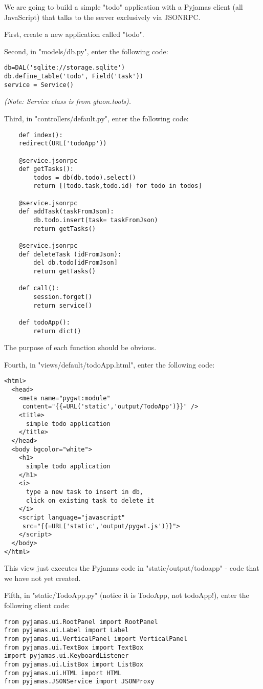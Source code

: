 \documentclass[justified,sixbynine,notoc]{tufte-book}
\begin{document}
\begin{fullwidth}
We are going to build a simple "todo" application with a Pyjamas client (all JavaScript) that talks to the server exclusively via JSONRPC.

First, create a new application called "todo".

Second, in "models/db.py", enter the following code:
\begin{lstlisting}
db=DAL('sqlite://storage.sqlite')
db.define_table('todo', Field('task'))
service = Service()
\end{lstlisting}

{\it (Note: Service class is from gluon.tools).}

Third, in "controllers/default.py", enter the following code:
\begin{lstlisting}
    def index():
    redirect(URL('todoApp'))

    @service.jsonrpc
    def getTasks():
        todos = db(db.todo).select()
        return [(todo.task,todo.id) for todo in todos]

    @service.jsonrpc
    def addTask(taskFromJson):
        db.todo.insert(task= taskFromJson)
        return getTasks()

    @service.jsonrpc
    def deleteTask (idFromJson):
        del db.todo[idFromJson]
        return getTasks()

    def call():
        session.forget()
        return service()

    def todoApp():
        return dict()
\end{lstlisting}

The purpose of each function should be obvious.

Fourth, in "views/default/todoApp.html", enter the following code:
\begin{lstlisting}[keywords={}]
<html>
  <head>
    <meta name="pygwt:module"
     content="{{=URL('static','output/TodoApp')}}" />
    <title>
      simple todo application
    </title>
  </head>
  <body bgcolor="white">
    <h1>
      simple todo application
    </h1>
    <i>
      type a new task to insert in db,
      click on existing task to delete it
    </i>
    <script language="javascript"
     src="{{=URL('static','output/pygwt.js')}}">
    </script>
  </body>
</html>
\end{lstlisting}

This view just executes the Pyjamas code in "static/output/todoapp" - code that we have not yet created.

Fifth, in "static/TodoApp.py" (notice it is TodoApp, not todoApp!),
enter the following client code:
\begin{lstlisting}
from pyjamas.ui.RootPanel import RootPanel
from pyjamas.ui.Label import Label
from pyjamas.ui.VerticalPanel import VerticalPanel
from pyjamas.ui.TextBox import TextBox
import pyjamas.ui.KeyboardListener
from pyjamas.ui.ListBox import ListBox
from pyjamas.ui.HTML import HTML
from pyjamas.JSONService import JSONProxy


\end{lstlisting}
\end{fullwidth}
\end{document}
